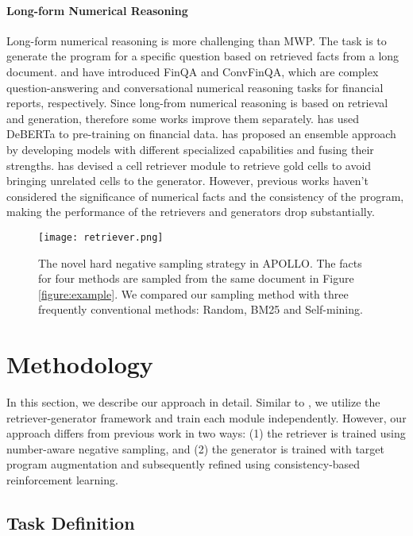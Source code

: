 \documentclass[11pt]{article}
\begin{document}
\paragraph{Long-form Numerical Reasoning}
Long-form numerical reasoning is more challenging than MWP. The task is to generate the program for a specific question based on retrieved facts from a long document. \citet{chen2021finqa} and \citet{convfinqa} have introduced FinQA and ConvFinQA, which are complex question-answering and conversational numerical reasoning tasks for financial reports, respectively. Since long-from numerical reasoning is based on retrieval and generation, therefore some works improve them separately. \citet{wang2022novel} has used DeBERTa \cite{he2021debertav3} to pre-training on financial data. \citet{zhang2022robustly} has proposed an ensemble approach by developing models with different specialized capabilities and fusing their strengths. \citet{wang2022numerical} has devised a cell retriever module to retrieve gold cells to avoid bringing unrelated cells to the generator. However, previous works haven't considered the significance of numerical facts and the consistency of the program, making the performance of the retrievers and generators drop substantially.

\begin{figure}[t]
    \centerline{\texttt{[image: retriever.png]}}
    \caption{The novel hard negative sampling strategy in APOLLO. The facts for four methods are sampled from the same document in Figure \ref{figure:example}. We compared our sampling method with three frequently conventional methods: Random, BM25 and Self-mining.}
    \label{figure:retriever}
\end{figure}

\section{Methodology}
In this section, we describe our approach in detail. Similar to \citet{chen2021finqa}, we utilize the retriever-generator framework and train each module independently. However, our approach differs from previous work \cite{zhang2022robustly, zhang2022elastic} in two ways: (1) the retriever is trained using number-aware negative sampling, and (2) the generator is trained with target program augmentation and subsequently refined using consistency-based reinforcement learning.

\subsection{Task Definition}
\label{sec:task_definition}
\end{document}
